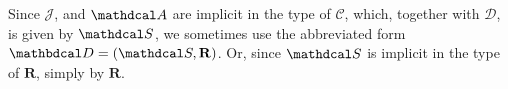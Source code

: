 \documentclass{article}
\theoremstyle{plain}
\theoremstyle{definition}
\theoremstyle{remark}
\newcommand\mat[1]{\mathbf{#1}}
\newcommand\Set{\mathbb{S}\mathrm{et}}
\newcommand{\D}{\mathbdcal D} %
\newcommand{\Attrs}{\mathdcal A}
\newcommand{\Idx}{\mathcal J}
\newcommand{\Doms}{{\mathcal D}}
\newcommand{\Rels}{{\mathbf R}}
\newcommand{\Cols}{\mathcal C}%
\newcommand{\Sch}{\mathdcal S}%
\newcommand{\arity}{\mathit{ar}}
\begin{document}
\begin{defn}[database]




\smallskip
Since $\Idx$, and $\Attrs$ are implicit in the type of $\Cols$, which, together with $\Doms$, is given by $\Sch$, 
we sometimes use the abbreviated form $\D = (\Sch, \Rels)$.  Or, since $\Sch$ is implicit in the type of $\Rels$, simply by $\Rels$.
\end{defn}
\medskip
\end{document}
